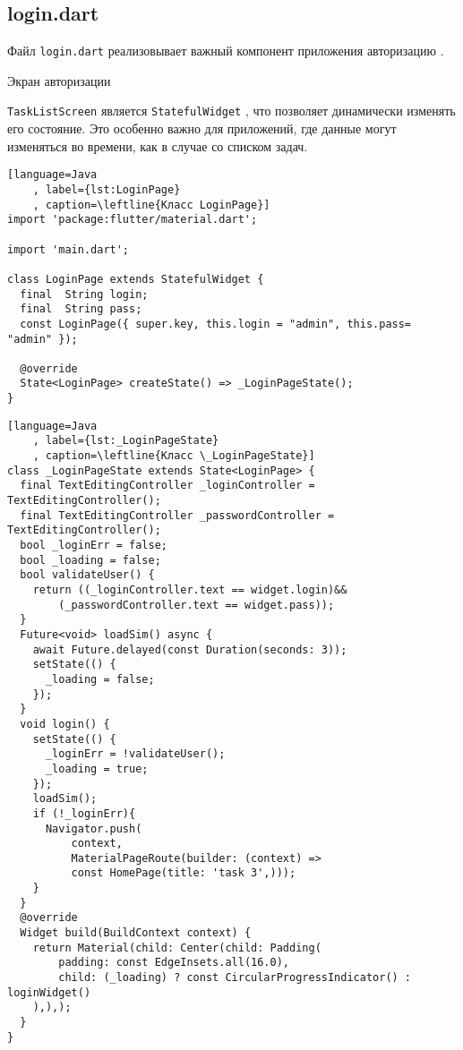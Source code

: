 \subsection{login.dart}

Файл \texttt{login.dart} реализовывает важный компонент
приложения авторизацию .

\begin{image}
	\caption{Экран авторизации}
	\label{fig:login}
\end{image}

\texttt{TaskListScreen}
является \texttt{StatefulWidget} ,
что позволяет динамически изменять его состояние.
Это особенно важно для приложений,
где данные могут изменяться во времени, как в случае со списком задач.

\begin{lstlisting}[language=Java
	, label={lst:LoginPage}
	, caption=\leftline{Класс LoginPage}]
import 'package:flutter/material.dart';

import 'main.dart';

class LoginPage extends StatefulWidget {
  final  String login;
  final  String pass;
  const LoginPage({ super.key, this.login = "admin", this.pass= "admin" });

  @override
  State<LoginPage> createState() => _LoginPageState();
}
\end{lstlisting}
\clearpage

\begin{lstlisting}[language=Java
	, label={lst:_LoginPageState}
	, caption=\leftline{Класс \_LoginPageState}]
class _LoginPageState extends State<LoginPage> {
  final TextEditingController _loginController = TextEditingController();
  final TextEditingController _passwordController = TextEditingController();
  bool _loginErr = false;
  bool _loading = false;
  bool validateUser() {
    return ((_loginController.text == widget.login)&&
        (_passwordController.text == widget.pass));
  }
  Future<void> loadSim() async {
    await Future.delayed(const Duration(seconds: 3));
    setState(() {
      _loading = false;
    });
  }
  void login() {
    setState(() {
      _loginErr = !validateUser();
      _loading = true;
    });
    loadSim();
    if (!_loginErr){
      Navigator.push(
          context,
          MaterialPageRoute(builder: (context) =>
          const HomePage(title: 'task 3',)));
    }
  }
  @override
  Widget build(BuildContext context) {
    return Material(child: Center(child: Padding(
        padding: const EdgeInsets.all(16.0),
        child: (_loading) ? const CircularProgressIndicator() : loginWidget()
    ),),);
  }
}
\end{lstlisting}
\clearpage

